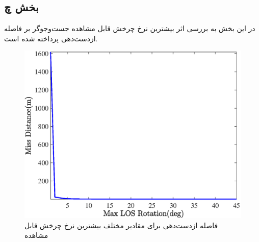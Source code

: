 \subsection{بخش چ}
در این بخش به بررسی اثر بیشترین نرخ چرخش قابل مشاهده جست‌وجوگر بر فاصله‌ ازدست‌دهی پرداخته شده است.
\begin{figure}[H]
	\centering
	\includegraphics[width=.75\linewidth]{../Figure/Q1/g/MD}
	\caption{فاصله ازدست‌دهی برای مقادیر مختلف بیشترین نرخ چرخش قابل مشاهده}
\end{figure}